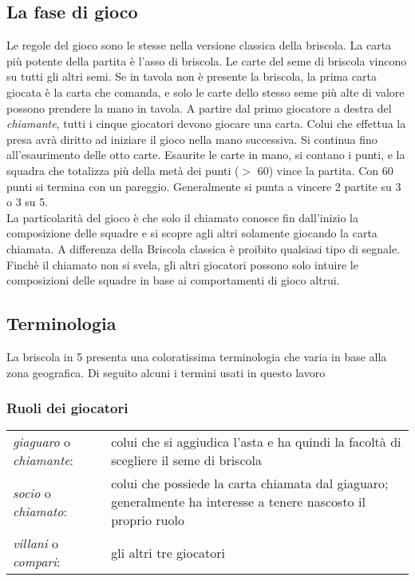 \subsection{La fase di gioco}

Le regole del gioco sono le stesse nella versione classica della briscola.
La carta più potente della partita è l'asso di briscola.
Le carte del seme di briscola vincono su tutti gli altri semi.
Se in tavola non è presente la briscola, la prima carta giocata è la carta che comanda, e solo le carte dello stesso seme più alte di valore possono prendere la mano in tavola.
A partire dal primo giocatore a destra del \emph{chiamante}, tutti i cinque giocatori devono giocare una carta.
Colui che effettua la presa avrà diritto ad iniziare il gioco nella mano successiva.
Si continua fino all'esaurimento delle otto carte. Esaurite le carte in mano, si contano i punti, e la squadra che totalizza più della metà dei punti ($ > $ 60) vince la partita.
Con 60 punti si termina con un pareggio.
Generalmente si punta a vincere 2 partite su 3 o 3 su 5.\\
La particolarità del gioco è che solo il chiamato conosce fin dall'inizio la composizione delle squadre e si scopre agli altri solamente giocando la carta chiamata. A differenza della Briscola classica è proibito qualsiasi tipo di segnale. \cite{enciclopediacarte}\\
Finchè il chiamato non si svela, gli altri giocatori possono solo intuire le composizioni delle squadre in base ai comportamenti di gioco altrui.

\subsection{Terminologia}

La briscola in 5 presenta una coloratissima terminologia che varia in base alla zona geografica.
Di seguito alcuni i termini usati in questo lavoro

\subsubsection*{Ruoli dei giocatori}
\vspace{4mm}
\begin{tabular}{l p{}}
\emph{giaguaro} o \emph{chiamante}: & colui che si aggiudica l'asta e ha quindi la facoltà di scegliere il seme di briscola \\
\emph{socio} o \emph{chiamato}: & colui che possiede la carta chiamata dal giaguaro; generalmente ha interesse a tenere nascosto il proprio ruolo \\
\emph{villani} o \emph{compari}: & gli altri tre giocatori \\   
\end{tabular}\\


